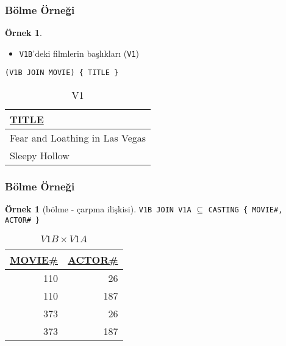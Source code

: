 \documentclass[dvipsnames]{beamer}
\theoremstyle{definition}
\theoremstyle{example}
\newtheorem{ornek}[theorem]{Örnek}
\theoremstyle{plain}
\begin{document}
\begin{frame}[fragile]
  \frametitle{Bölme Örneği}

  \begin{ornek}
    \begin{itemize}
      \item \texttt{V1B}'deki filmlerin başlıkları (\texttt{V1})
    \end{itemize}

    \begin{lstlisting}
(V1B JOIN MOVIE) { TITLE }
    \end{lstlisting}

    \pause
    \vspace{-10pt}
    \begin{tiny}
    \begin{table}
      \caption{V1}
      \begin{tabular}{|l|}\hline
\underline{TITLE}             \\[2pt]\hline\hline
Fear and Loathing in Las Vegas\\\hline
Sleepy Hollow                 \\\hline
      \end{tabular}
    \end{table}
    \end{tiny}
  \end{ornek}
\end{frame}

\begin{frame}[fragile]
  \frametitle{Bölme Örneği}

  \begin{ornek}[bölme - çarpma ilişkisi]
    \lstinline!V1B JOIN V1A! $\subseteq$ \lstinline!CASTING { MOVIE#, ACTOR# }!

    \pause
    \begin{tiny}
    \begin{table}
      \caption{$V1B \times V1A$}
      \begin{tabular}{|r|r|}\hline
\underline{MOVIE\#} & \underline{ACTOR\#}\\[2pt]\hline\hline
                110 &                  26\\\hline
                110 &                 187\\\hline
                373 &                  26\\\hline
                373 &                 187\\\hline
      \end{tabular}
    \end{table}
    \end{tiny}
  \end{ornek}
\end{frame}
\end{document}
